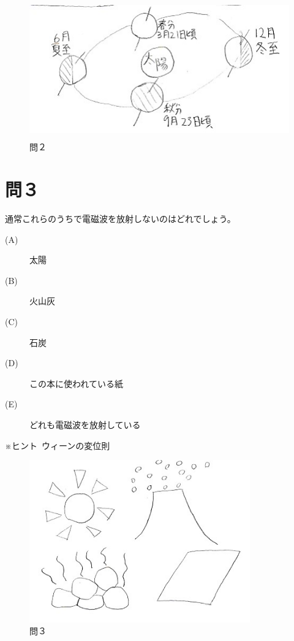 \vspace{3zw}
\begin{figure}[H]
  \centering
  \includegraphics[height=6cm,clip]{nishimura/image/toi2.jpg}
  \caption{問２}
  \label{fig:toi2}
\end{figure}

\newpage
\section*{問３}
通常これらのうちで電磁波を放射しないのはどれでしょう。

\begin{description}
  \item[(A)] 太陽
  \item[(B)] 火山灰
  \item[(C)] 石炭
  \item[(D)] この本に使われている紙
  \item[(E)] どれも電磁波を放射している
\end{description}
※ヒント\ ウィーンの変位則
\vspace{3zw}
\begin{figure}[H]
  \centering
  \includegraphics[height=7cm,clip]{nishimura/image/toi3.jpg}
  \caption{問３}
  \label{fig:toi3}
\end{figure}

